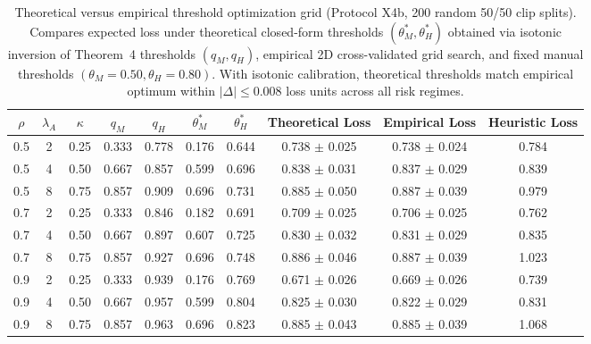 \begin{table}[t]
\centering
\caption{Theoretical versus empirical threshold optimization grid (Protocol X4b, 200 random 50/50 clip splits). Compares expected loss under theoretical closed-form thresholds $(\theta_M^*, \theta_H^*)$ obtained via isotonic inversion of Theorem~4 thresholds $(q_M, q_H)$, empirical 2D cross-validated grid search, and fixed manual thresholds $(\theta_M=0.50, \theta_H=0.80)$. With isotonic calibration, theoretical thresholds match empirical optimum within $|\Delta| \le 0.008$ loss units across all risk regimes.}
\label{tab:x4b_threshold_optimization}
\small
\begin{tabular}{cccccccccc}
\toprule
$\rho$ & $\lambda_A$ & $\kappa$ & $q_M$ & $q_H$ & $\theta_M^*$ & $\theta_H^*$ & Theoretical Loss & Empirical Loss & Heuristic Loss \\
\midrule
0.5 & 2 & 0.25 & 0.333 & 0.778 & 0.176 & 0.644 & 0.738 $\pm$ 0.025 & 0.738 $\pm$ 0.024 & 0.784 \\
0.5 & 4 & 0.50 & 0.667 & 0.857 & 0.599 & 0.696 & 0.838 $\pm$ 0.031 & 0.837 $\pm$ 0.029 & 0.839 \\
0.5 & 8 & 0.75 & 0.857 & 0.909 & 0.696 & 0.731 & 0.885 $\pm$ 0.050 & 0.887 $\pm$ 0.039 & 0.979 \\
0.7 & 2 & 0.25 & 0.333 & 0.846 & 0.182 & 0.691 & 0.709 $\pm$ 0.025 & 0.706 $\pm$ 0.025 & 0.762 \\
0.7 & 4 & 0.50 & 0.667 & 0.897 & 0.607 & 0.725 & 0.830 $\pm$ 0.032 & 0.831 $\pm$ 0.029 & 0.835 \\
0.7 & 8 & 0.75 & 0.857 & 0.927 & 0.696 & 0.748 & 0.886 $\pm$ 0.046 & 0.887 $\pm$ 0.039 & 1.023 \\
0.9 & 2 & 0.25 & 0.333 & 0.939 & 0.176 & 0.769 & 0.671 $\pm$ 0.026 & 0.669 $\pm$ 0.026 & 0.739 \\
0.9 & 4 & 0.50 & 0.667 & 0.957 & 0.599 & 0.804 & 0.825 $\pm$ 0.030 & 0.822 $\pm$ 0.029 & 0.831 \\
0.9 & 8 & 0.75 & 0.857 & 0.963 & 0.696 & 0.823 & 0.885 $\pm$ 0.043 & 0.885 $\pm$ 0.039 & 1.068 \\
\bottomrule
\end{tabular}
\end{table}
